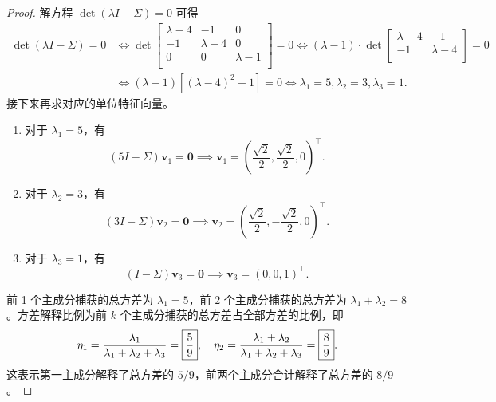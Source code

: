 \begin{proof}
解方程 $\det \left(\lambda I - \Sigma\right) = 0$ 可得 \[\begin{aligned}
    \det \left(\lambda I - \Sigma\right) = 0 &\iff \det\begin{bmatrix}
        \lambda - 4 & -1 & 0 \\
        -1 & \lambda - 4 & 0 \\
        0 & 0 & \lambda - 1 \\
    \end{bmatrix} = 0 \iff \left(\lambda - 1\right) \cdot \det\begin{bmatrix}
        \lambda - 4 & -1 \\
        -1 & \lambda - 4 \\
    \end{bmatrix} = 0 \\
    &\iff \left(\lambda - 1\right) \left[\left(\lambda - 4\right)^2 - 1\right] = 0 \iff \boxed{\lambda_1 = 5, \lambda_2 = 3, \lambda_3 = 1}.
\end{aligned}\]
接下来再求对应的单位特征向量。

\begin{enumerate}
    \item 对于 $\lambda_1 = 5$，有 \[\left(5 I - \Sigma\right) \boldsymbol{v}_1 = \boldsymbol{0} \implies \boxed{\boldsymbol{v}_1 = \left(\frac{\sqrt{2}}{2}, \frac{\sqrt{2}}{2}, 0\right)^\top}.\]
    \item 对于 $\lambda_2 = 3$，有 \[\left(3 I - \Sigma\right) \boldsymbol{v}_2 = \boldsymbol{0} \implies \boxed{\boldsymbol{v}_2 = \left(\frac{\sqrt{2}}{2}, -\frac{\sqrt{2}}{2}, 0\right)^\top}.\]
    \item 对于 $\lambda_3 = 1$，有 \[\left(I - \Sigma\right) \boldsymbol{v}_3 = \boldsymbol{0} \implies \boxed{\boldsymbol{v}_3 = \left(0, 0, 1\right)^\top}.\]
\end{enumerate}

前 1 个主成分捕获的总方差为 $\lambda_1 = \boxed{5}$，前 2 个主成分捕获的总方差为 $\lambda_1 + \lambda_2 = \boxed{8}$。方差解释比例为前 $k$ 个主成分捕获的总方差占全部方差的比例，即 \[
    \eta_1 = \frac{\lambda_1}{\lambda_1 + \lambda_2 + \lambda_3} = \boxed{\frac{5}{9}}, \quad \eta_2 = \frac{\lambda_1 + \lambda_2}{\lambda_1 + \lambda_2 + \lambda_3} = \boxed{\frac{8}{9}}. \\
\]
这表示第一主成分解释了总方差的 $5/9$，前两个主成分合计解释了总方差的 $8/9$。
\end{proof}
